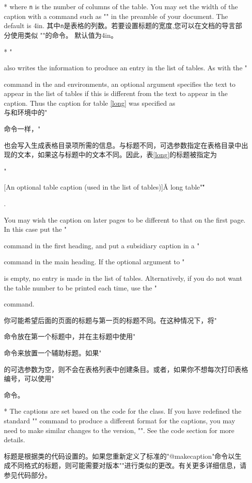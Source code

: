 \begin{paracol}{2}
\switchcolumn[0]*
where \texttt{n} is the number of columns of the table. You may set
the width of the caption with a command such as
"\setlength{\LTcapwidth}{2in}"
in the preamble of your document. The default is 4in. 
\switchcolumn
其中\texttt{n}是表格的列数。若要设置标题的宽度,您可以在文档的导言部分使用类似
"\setlength{\LTcapwidth}{2in}"的命令。
默认值为4in。

\switchcolumn[0]*
"\caption" also
writes the information to produce an entry in the list of tables. As
with the "\caption" command in the  and 
environments, an optional argument specifies the text to appear in the
list of tables if this is different from the text to appear in the
caption. Thus the caption for table \ref{long} was specified as\\与和环境中的"\caption"命令一样，"\caption"也会写入生成表格目录项所需的信息。与标题不同，可选参数指定在表格目录中出现的文本，如果这与标题中的文本不同。因此，表\ref{long}的标题被指定为%
{\ttfamily
 "\caption"[An optional table caption
            (used in the list of tables)]\v{A long
 table"\label{long}"\v}}.

You may wish the caption on later pages to be different to that on the
first page. In this case put the "\caption" command in the first
heading, and put a subsidiary caption in a "\caption[]" command in
the main heading. If the optional argument to "\caption" is empty,
no entry is made in the list of tables. Alternatively, if you do not
want the table number to be printed each time, use the "\caption*"
command.\switchcolumn 

你可能希望后面的页面的标题与第一页的标题不同。在这种情况下，将"\caption"命令放在第一个标题中，并在主标题中使用"\caption[]"命令来放置一个辅助标题。如果"\caption"的可选参数为空，则不会在表格列表中创建条目。或者，如果你不想每次打印表格编号，可以使用"\caption*"命令。

\switchcolumn[0]*
The captions are set based on the code for the 
class.
If you have redefined the standard "\@makecaption" command to produce
a different format for the captions, you may
need to make similar changes to the  version,
"\LT@makecaption". See the code section for more details.\switchcolumn 

标题是根据类的代码设置的。如果您重新定义了标准的"@makecaption"命令以生成不同格式的标题，则可能需要对版本"\LT@makecaption"进行类似的更改。有关更多详细信息，请参见代码部分。


\end{paracol}
